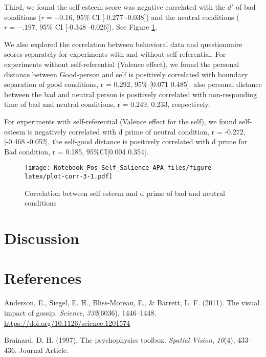 \documentclass[
  english,
  man]{apa6}
\begin{document}
Third, we found the self esteem score was negative correlated with the \(d'\) of bad conditions (\(r = -0.16\), 95\% CI {[}-0.277 -0.038{]}) and the neutral conditions (\(r = -.197\), 95\% CI {[}-0.348 -0.026{]}). See Figure \ref{fig:plot-corr-3}.

We also explored the correlation between behavioral data and questionnaire scores separately for experiments with and without self-referential. For experiments without self-referential (Valence effect), we found the personal distance between Good-person and self is positively correlated with boundary separation of good conditions, r = 0.292, 95\% {[}0.071 0.485{]}. also personal distance between the bad and neutral person is positively correlated with non-responding time of bad and neutral conditions, r = 0.249, 0.233, respectively.

For experiments with self-referential (Valence effect for the self), we found self-esteem is negatively correlated with d prime of neutral condition, r = -0.272, {[}-0.468 -0.052{]}, the self-good distance is positively correlated with d prime for Bad condition, r = 0.185, 95\%CI{[}0.004 0.354{]}.

\begin{figure}
\centering
\texttt{[image: Notebook\_Pos\_Self\_Salience\_APA\_files/figure-latex/plot-corr-3-1.pdf]}
\caption{\label{fig:plot-corr-3}Correlation between self esteem and d prime of bad and neutral conditions}
\end{figure}

\hypertarget{discussion}{%
\section{Discussion}\label{discussion}}

\hypertarget{references}{%
\section{References}\label{references}}

\begingroup
\setlength{\parindent}{-0.5in}
\setlength{\leftskip}{0.5in}

\hypertarget{refs}{}
\leavevmode\hypertarget{ref-anderson_visual_2011}{}%
Anderson, E., Siegel, E. H., Bliss-Moreau, E., \& Barrett, L. F. (2011). The visual impact of gossip. \emph{Science}, \emph{332}(6036), 1446--1448. \url{https://doi.org/10.1126/science.1201574}

\leavevmode\hypertarget{ref-Brainard_1997}{}%
Brainard, D. H. (1997). The psychophysics toolbox. \emph{Spatial Vision}, \emph{10}(4), 433--436. Journal Article.
\end{document}
